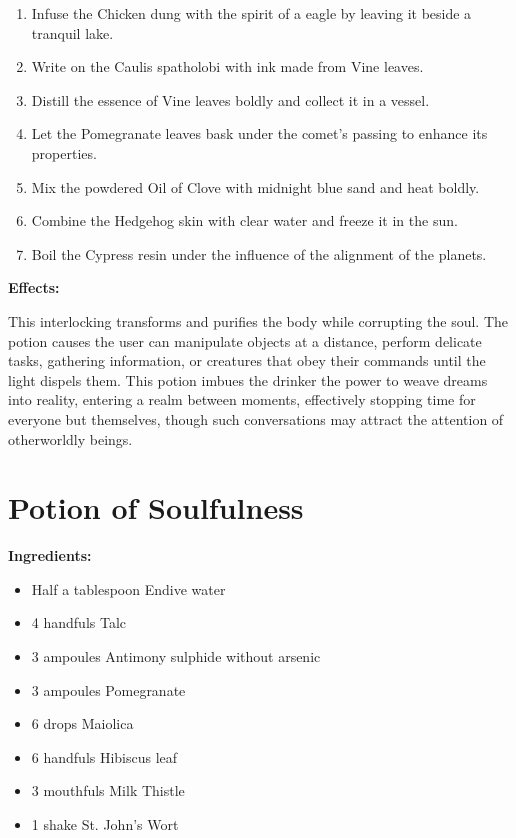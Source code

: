 \documentclass{article}
\begin{document}
\begin{enumerate}
  \item Infuse the Chicken dung with the spirit of a eagle by leaving it beside a tranquil lake.
  \item Write on the Caulis spatholobi with ink made from Vine leaves.
  \item Distill the essence of Vine leaves boldly and collect it in a vessel.
  \item Let the Pomegranate leaves bask under the comet’s passing to enhance its properties.
  \item Mix the powdered Oil of Clove with midnight blue sand and heat boldly.
  \item Combine the Hedgehog skin with clear water and freeze it in the sun.
  \item Boil the Cypress resin under the influence of the alignment of the planets.
\end{enumerate}

\textbf{Effects:}

This interlocking transforms and purifies the body while corrupting the soul. The potion causes the user can manipulate objects at a distance, perform delicate tasks, gathering information, or creatures that obey their commands until the light dispels them. This potion imbues the drinker the power to weave dreams into reality, entering a realm between moments, effectively stopping time for everyone but themselves, though such conversations may attract the attention of otherworldly beings.

\newpage
\section*{Potion of Soulfulness}

\textbf{Ingredients:}

\begin{itemize}
  \item Half a tablespoon Endive water
  \item 4 handfuls Talc
  \item 3 ampoules Antimony sulphide without arsenic
  \item 3 ampoules Pomegranate
  \item 6 drops Maiolica
  \item 6 handfuls Hibiscus leaf
  \item 3 mouthfuls Milk Thistle
  \item 1 shake St. John's Wort
\end{itemize}
\end{document}
